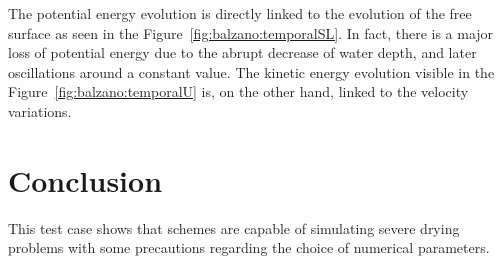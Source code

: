 The potential energy evolution is directly linked to the evolution of the free surface as
seen in the Figure~\ref{fig:balzano:temporalSL}. In fact, there is a major loss of
potential energy due to the abrupt decrease of water depth, and later oscillations around a constant value.
The kinetic energy evolution visible in the Figure~\ref{fig:balzano:temporalU} is,
on the other hand, linked to the velocity variations.



%
\section{Conclusion}

This test case shows that  schemes are capable of simulating severe drying problems
with some precautions regarding the choice of numerical parameters.


